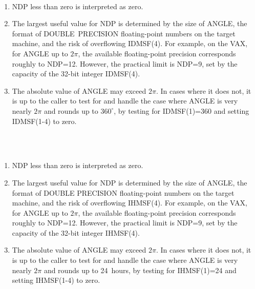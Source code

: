 {
  \\
}
\notes
{
 \begin{enumerate}
  \item NDP less than zero is interpreted as zero.
  \item The largest useful value for NDP is determined by the size
        of ANGLE, the format of DOUBLE~PRECISION floating-point numbers
        on the target machine, and the risk of overflowing IDMSF(4).
        For example, on the VAX, for ANGLE up to $2\pi$, the available
        floating-point precision corresponds roughly to NDP=12.  However,
        the practical limit is NDP=9, set by the capacity of the 32-bit
        integer IDMSF(4).
  \item The absolute value of ANGLE may exceed $2\pi$.  In cases where it
        does not, it is up to the caller to test for and handle the
        case where ANGLE is very nearly $2\pi$ and rounds up to $360^{\circ}$,
        by testing for IDMSF(1)=360 and setting IDMSF(1-4) to zero.
 \end{enumerate}
}
{
}
{
  \\
}
{
  \\
}
\notes
{
 \begin{enumerate}
  \item NDP less than zero is interpreted as zero.
  \item The largest useful value for NDP is determined by the size
        of ANGLE, the format of DOUBLE PRECISION floating-point numbers
        on the target machine, and the risk of overflowing IHMSF(4).
        For example, on the VAX, for ANGLE up to $2\pi$, the available
        floating-point precision corresponds roughly to NDP=12.  However,
        the practical limit is NDP=9, set by the capacity of the 32-bit
        integer IHMSF(4).
  \item The absolute value of ANGLE may exceed $2\pi$.  In cases where it
        does not, it is up to the caller to test for and handle the
        case where ANGLE is very nearly $2\pi$ and rounds up to 24~hours,
        by testing for IHMSF(1)=24 and setting IHMSF(1-4) to zero.
\end{enumerate}
}
